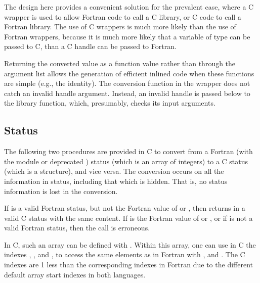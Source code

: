 \begin{rationale}
The design here provides a convenient solution for the prevalent case,
where a C wrapper is used to allow Fortran code to call a C
library, or C code to call a Fortran library.
The use of C wrappers is much more likely than the use of Fortran
wrappers, because it is much more likely that a variable of type
 can be passed to C,  than a C handle
can be passed to Fortran.

Returning the converted value as a function value rather than
through the argument list allows the generation of efficient
inlined code when these functions are simple (e.g., the identity).
The conversion function in the wrapper
does not catch an invalid handle argument.  Instead, an invalid handle
is passed below to the library function, which, presumably, checks its
input arguments.
\end{rationale}

\subsection{Status}
\label{sec:conversion:status}

The following two procedures are provided in C to convert from a
Fortran (with the  module or deprecated )
status (which is an array of integers) to a C status (which is
a structure), and vice versa.
The conversion occurs on all the information in status, including that which
is hidden.  That is, no status information is lost in the conversion.

%

If  is a valid Fortran status, but not the Fortran value of
 or , then
 returns in  a valid C status with
the same content.  If  is the Fortran value of
 or , or if
 is not a valid Fortran status, then the call is erroneous.

\label{sec:conversion:status:C_F_constants}
In C, such an  array can be defined with . Within this array, one can use in
C the indexes , , and
, to access the same elements as in Fortran with
,  and . The C indexes are
1 less than the corresponding indexes in Fortran due to the different default array
start indexes in both languages.

